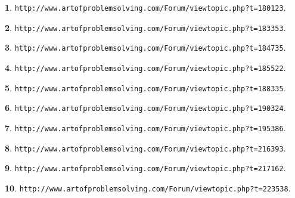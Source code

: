 \documentclass{article}
\theoremstyle{definition}
\newtheorem{s}{}
\begin{document}
\begin{s}
\texttt{http://www.artofproblemsolving.com/Forum/viewtopic.php?t=180123}.
\end{s}





\begin{s}
\texttt{http://www.artofproblemsolving.com/Forum/viewtopic.php?t=183353}.
\end{s}




\begin{s}
\texttt{http://www.artofproblemsolving.com/Forum/viewtopic.php?t=184735}.
\end{s}




\begin{s}
\texttt{http://www.artofproblemsolving.com/Forum/viewtopic.php?t=185522}.
\end{s}





\begin{s}
\texttt{http://www.artofproblemsolving.com/Forum/viewtopic.php?t=188335}.
\end{s}




\begin{s}
\texttt{http://www.artofproblemsolving.com/Forum/viewtopic.php?t=190324}.
\end{s}




\begin{s}
\texttt{http://www.artofproblemsolving.com/Forum/viewtopic.php?t=195386}.
\end{s}





\begin{s}
\texttt{http://www.artofproblemsolving.com/Forum/viewtopic.php?t=216393}.
\end{s}




\begin{s}
\texttt{http://www.artofproblemsolving.com/Forum/viewtopic.php?t=217162}.
\end{s}




\begin{s}
\texttt{http://www.artofproblemsolving.com/Forum/viewtopic.php?t=223538}.
\end{s}
\end{document}
